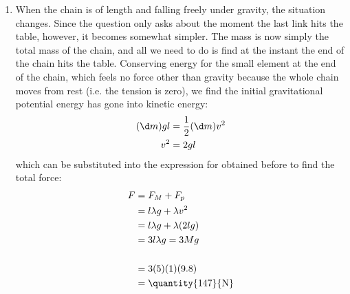 \begin{problem}[HE+_Chain]
{\begin{enumerate}
The force from the momentum, given by Newton's Second Law, requires us to know . We know  and so at constant ,  $=$ . Thus  $=$  downwards.

The total force is the sum of  and :
\begin{eqnarray*} 
F &= F_{M} + F_{p} \\ 
&= \lambda v g t + \lambda v^{2} \\ 
\\ 
&= [(1)(5)(9.8)(5) + (1)(5)^{2}] \\ &= \mbox{\quantity{270}{N}}

\answer[a]{The force exerted down on the table is \valuedef{F}{270}{N}}

 \end{eqnarray*}
	\item When the chain is of length  and falling freely under gravity, the situation changes. Since the question only asks about the moment the last link hits the table, however, it becomes somewhat simpler. The mass  is now simply the total mass of the chain, and all we need to do is find  at the instant the end of the chain hits the table. Conserving energy for the small element at the end of the chain, which feels no force other than gravity because the whole chain moves from rest (i.e. the tension is zero), we find the initial gravitational potential energy has gone into kinetic energy:
\begin{eqnarray*} 
(\d m)gl &= \frac{1}{2}(\d m)v^{2} \\ 
v^{2} &= 2gl 
\end{eqnarray*}
which can be substituted into the expression for  obtained before to find the total force:
\begin{eqnarray*} F &= F_{M} + F_{p} \\ 
&= l\lambda g + \lambda v^{2} \\ 
&= l\lambda g + \lambda (2lg) \\ &= 3 l \lambda g = 3Mg \\ \\ 
&= 3(5)(1)(9.8)
\\ &= \mbox{\quantity{147}{N}}
 \end{eqnarray*}


\end{enumerate}
}
\end{problem}